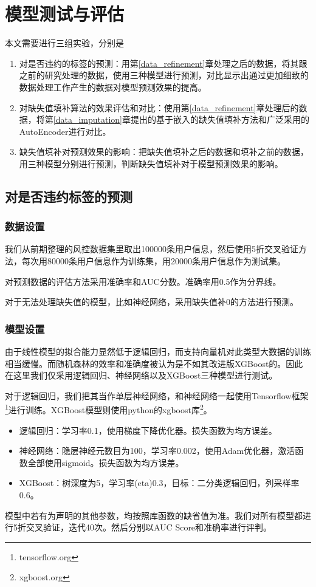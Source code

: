 \chapter{模型测试与评估}
本文需要进行三组实验，分别是
\begin{enumerate}
    \item 对是否违约的标签的预测：用第\ref{data_refinement}章处理之后的数据，将其跟之前的研究\cite{czh}处理的数据，使用三种模型进行预测，对比显示出通过更加细致的数据处理工作产生的数据对模型预测效果的提高。
    \item 对缺失值填补算法的效果评估和对比：使用第\ref{data_refinement}章处理后的数据，将第\ref{data_imputation}章提出的基于嵌入的缺失值填补方法和广泛采用的AutoEncoder进行对比。
    \item 缺失值填补对预测效果的影响：把缺失值填补之后的数据和填补之前的数据，用三种模型分别进行预测，判断缺失值填补对于模型预测效果的影响。
\end{enumerate}
\section{对是否违约标签的预测}
\subsection{数据设置}
我们从前期整理的风控数据集里取出100000条用户信息，然后使用5折交叉验证方法，每次用80000条用户信息作为训练集，用20000条用户信息作为测试集。

对预测数据的评估方法采用准确率和AUC分数。准确率用0.5作为分界线。

对于无法处理缺失值的模型，比如神经网络，采用缺失值补0的方法进行预测。
\subsection{模型设置}
由于线性模型的拟合能力显然低于逻辑回归，而支持向量机对此类型大数据的训练相当缓慢。而随机森林的效率和准确度被认为是不如其改进版XGBoost的。因此在这里我们仅采用逻辑回归、神经网络以及XGBoost三种模型进行测试。

对于逻辑回归，我们把其当作单层神经网络，和神经网络一起使用Tensorflow框架\footnote{tensorflow.org}进行训练。XGBoost模型则使用python的xgboost库\footnote{xgboost.org}。
\begin{itemize}
    \item 逻辑回归：学习率0.1，使用梯度下降优化器。损失函数为均方误差。
    \item 神经网络：隐层神经元数目为100，学习率0.002，使用Adam优化器，激活函数全部使用sigmoid。损失函数为均方误差。
    \item XGBoost：树深度为5，学习率(eta)0.3，目标：二分类逻辑回归，列采样率0.6。
\end{itemize}
模型中若有为声明的其他参数，均按照库函数的缺省值为准。我们对所有模型都进行5折交叉验证，迭代40次。然后分别以AUC Score和准确率进行评判。
